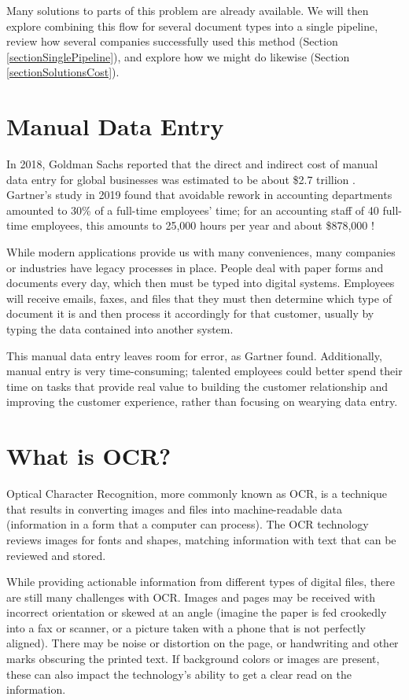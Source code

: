 \documentclass[conference, draftcls]{IEEEtran}
\begin{document}
Many solutions to parts of this problem are already available. We will then explore combining this flow for several document types into a single pipeline, review how several companies successfully used this method (Section \ref{sectionSinglePipeline}), and explore how we might do likewise (Section \ref{sectionSolutionsCost}).

\section{Manual Data Entry} \label{sectionManualDataEntry}
In 2018, Goldman Sachs reported that the direct and indirect cost of manual data entry for global businesses was estimated to be about \$2.7 trillion \cite{schneider2018b2b}. Gartner's study in 2019 found that avoidable rework in accounting departments amounted to 30\% of a full-time employees' time; for an accounting staff of 40 full-time employees, this amounts to 25,000 hours per year and about \$878,000 \cite{lavelle2019gartner}!

While modern applications provide us with many conveniences, many companies or industries have legacy processes in place. People deal with paper forms and documents every day, which then must be typed into digital systems. Employees will receive emails, faxes, and files that they must then determine which type of document it is and then process it accordingly for that customer, usually by typing the data contained into another system.

This manual data entry leaves room for error, as Gartner found. Additionally, manual entry is very time-consuming; talented employees could better spend their time on tasks that provide real value to building the customer relationship and improving the customer experience, rather than focusing on wearying data entry.

\section{What is OCR?} \label{sectionOcr}
Optical Character Recognition, more commonly known as OCR, is a technique that results in converting images and files into machine-readable data (information in a form that a computer can process). The OCR technology reviews images for fonts and shapes, matching information with text that can be reviewed and stored.

While providing actionable information from different types of digital files, there are still many challenges with OCR. Images and pages may be received with incorrect orientation or skewed at an angle (imagine the paper is fed crookedly into a fax or scanner, or a picture taken with a phone that is not perfectly aligned). There may be noise or distortion on the page, or handwriting and other marks obscuring the printed text. If background colors or images are present, these can also impact the technology's ability to get a clear read on the information.
\end{document}
